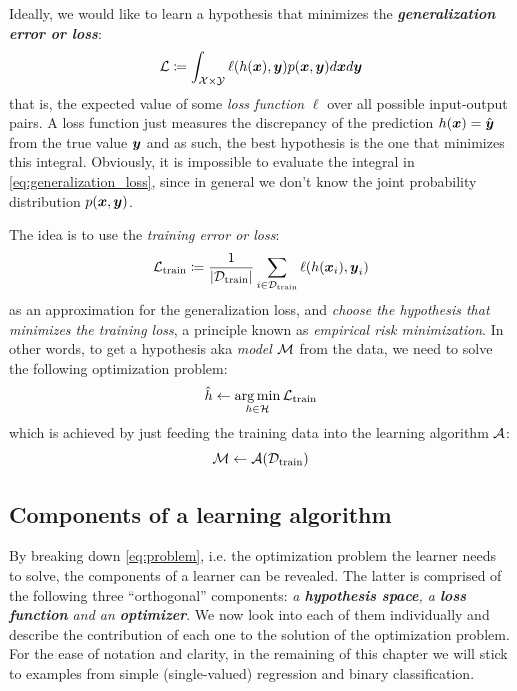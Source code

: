 Ideally, we would like to learn a hypothesis that minimizes the
\emph{\textbf{generalization error or loss}}:
\begin{equation}
	\label{eq:generalization_loss}
	\mathcal{L} \coloneqq
	\int_{\mathcal{X} \times \mathcal{Y}} \ell(h(\boldsymbol{x}), \boldsymbol{y}) p(\boldsymbol{x}, \boldsymbol{y}) d\boldsymbol{x} d\boldsymbol{y}
\end{equation}
that is, the expected value of some \emph{loss function}
$\ell$ over all possible input-output pairs. A loss function just measures the
discrepancy of the prediction $h(\boldsymbol{x}) = \hat{\boldsymbol{y}}$ from the true value $\boldsymbol{y}$
and as such, the best hypothesis is the one that minimizes this integral.
Obviously, it is impossible to evaluate the integral in \Equation{}
\ref{eq:generalization_loss}, since in general we don't know the joint
probability distribution $p(\boldsymbol{x}, \boldsymbol{y})$.

The idea is to use the \emph{training error or loss}:
\begin{equation}
	\label{eq:training_loss}
	\mathcal{L}_\text{train} \coloneqq \frac{1}{\lvert \mathcal{D}_\text{train} \rvert} \sum_{i \in \mathcal{D}_\text{train}}
	\ell(h(\boldsymbol{x}_i), \boldsymbol{y}_i)
\end{equation}
as an approximation for the generalization loss, and \emph{choose the hypothesis
that minimizes the training loss}, a principle known as \emph{empirical risk
minimization}. In other words, to get a
hypothesis aka \emph{model} $\mathcal{M}$ from the data, we need to
solve the following optimization problem:
\begin{equation}
	\label{eq:problem}
	\hat{h} \gets \operatorname*{arg\,min}_{h \in \mathcal{H}} \mathcal{L}_\text{train}
\end{equation}
which is achieved by just feeding the training data into the learning
algorithm $\mathcal{A}$:
\begin{equation}
	\label{eq:learner}
	\mathcal{M} \gets \mathcal{A}(\mathcal{D}_\text{train})
\end{equation}

\subsection{Components of a learning algorithm}

By breaking down \Equation{} \ref{eq:problem}, i.e. the optimization problem the
learner needs to solve, the components of a learner can be revealed. The latter
is comprised of the following three ``orthogonal'' components: \emph{a
\textbf{hypothesis space}, a \textbf{loss
function} and an \textbf{optimizer}}. We now look into each of them
individually and describe the contribution of each one to the solution of the
optimization problem. For the ease of notation and clarity, in the remaining of
this chapter we will stick to examples from simple (single-valued) regression
and binary classification.


